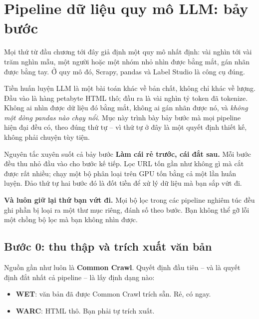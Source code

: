 
\section{Pipeline dữ liệu quy mô LLM: bảy bước}
\label{sec:llm_data_pipeline}

Mọi thứ từ đầu chương tới đây giả định một quy mô nhất định: vài nghìn tới vài trăm nghìn mẫu, một người hoặc một nhóm nhỏ nhìn được bằng mắt, gán nhãn được bằng tay. Ở quy mô đó, Scrapy, pandas và Label Studio là công cụ đúng.

Tiền huấn luyện LLM là một bài toán khác về bản chất, không chỉ khác về lượng. Đầu vào là hàng petabyte HTML thô; đầu ra là vài nghìn tỷ token đã tokenize. Không ai nhìn được dữ liệu đó bằng mắt, không ai gán nhãn được nó, và \emph{không một dòng pandas nào chạy nổi}. Mục này trình bày bảy bước mà mọi pipeline hiện đại đều có, theo đúng thứ tự -- vì thứ tự ở đây là một quyết định thiết kế, không phải chuyện tùy tiện.

\begin{deepdive}{Nguyên tắc xuyên suốt cả bảy bước}
\textbf{Làm cái rẻ trước, cái đắt sau.} Mỗi bước đều thu nhỏ đầu vào cho bước kế tiếp. Lọc URL tốn gần như không gì mà cắt được rất nhiều; chạy một bộ phân loại trên GPU tốn bằng cả một lần huấn luyện. Đảo thứ tự hai bước đó là đốt tiền để xử lý dữ liệu mà bạn sắp vứt đi.

\textbf{Và luôn giữ lại thứ bạn vứt đi.} Mọi bộ lọc trong các pipeline nghiêm túc đều ghi phần bị loại ra một thư mục riêng, đánh số theo bước. Bạn không thể gỡ lỗi một chồng bộ lọc mà bạn không nhìn được.
\end{deepdive}

\subsection{Bước 0: thu thập và trích xuất văn bản}
\label{ssec:acquisition}

Nguồn gần như luôn là \textbf{Common Crawl}. Quyết định đầu tiên -- và là quyết định đắt nhất cả pipeline -- là lấy định dạng nào:
\begin{itemize}
	\item \textbf{WET}: văn bản đã được Common Crawl trích sẵn. Rẻ, có ngay.
	\item \textbf{WARC}: HTML thô. Bạn phải tự trích xuất.
\end{itemize}

